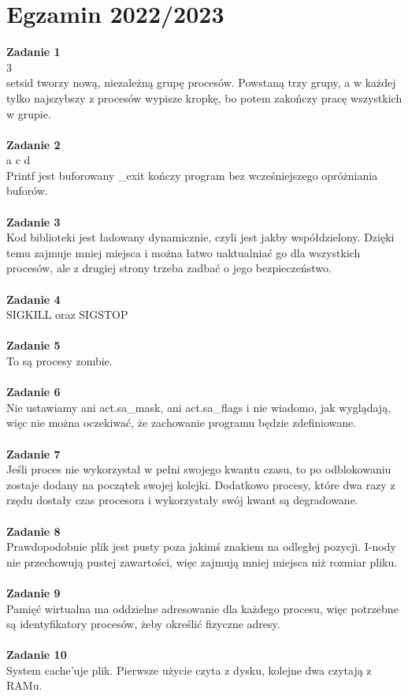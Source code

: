 \documentclass[12pt, a4paper, polish, openany]{book}
\begin{document}
\section{Egzamin 2022/2023}
\textbf{Zadanie 1} \\
3 \\
setsid tworzy nową, niezależną grupę procesów. Powstaną trzy grupy, a w każdej tylko najszybszy z procesów wypisze kropkę, bo potem zakończy pracę wszystkich w grupie. \\\\
\textbf{Zadanie 2} \\
a c d \\
Printf jest buforowany \_exit kończy program bez wcześniejszego opróżniania buforów. \\\\
\textbf{Zadanie 3} \\
Kod biblioteki jest ładowany dynamicznie, czyli jest jakby współdzielony. Dzięki temu zajmuje mniej miejsca i można łatwo uaktualniać go dla wszystkich procesów, ale z drugiej strony trzeba zadbać o jego bezpieczeństwo. \\\\
\textbf{Zadanie 4} \\
SIGKILL oraz SIGSTOP \\\\
\textbf{Zadanie 5} \\
To są procesy zombie. \\\\
\textbf{Zadanie 6} \\
Nie ustawiamy ani act.sa\_mask, ani act.sa\_flags i nie wiadomo, jak wyglądają, więc nie można oczekiwać, że zachowanie programu będzie zdefiniowane. \\\\
\textbf{Zadanie 7} \\
Jeśli proces nie wykorzystał w pełni swojego kwantu czasu, to po odblokowaniu zostaje dodany
na początek swojej kolejki. Dodatkowo procesy, które dwa razy z rzędu dostały czas procesora i wykorzystały swój kwant są degradowane. \\\\
\textbf{Zadanie 8} \\
Prawdopodobnie plik jest pusty poza jakimś znakiem na odległej pozycji. I-nody nie przechowują pustej zawartości, więc zajmują mniej miejsca niż rozmiar pliku. \\\\
\textbf{Zadanie 9} \\
Pamięć wirtualna ma oddzielne adresowanie dla każdego procesu, więc potrzebne są identyfikatory procesów, żeby określić fizyczne adresy.\\\\
\textbf{Zadanie 10} \\
System cache’uje plik. Pierwsze użycie czyta z dysku, kolejne dwa czytają z RAMu. \\\\
\end{document}
